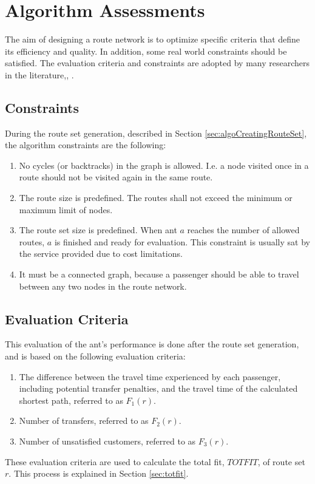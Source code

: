 \section{Algorithm Assessments}
The aim of designing a route network is to optimize specific criteria that define its efficiency and quality. In addition, some real world constraints should be satisfied. The evaluation criteria and constraints are adopted by many researchers in the literature\citep{kechagiopoulos14},\citep{fan09}, \citep{nikolic14}.

\subsection{Constraints}
\label{sec:algoConstraints}
During the route set generation, described in Section \vref{sec:algoCreatingRouteSet}, the algorithm constraints are the following:
\begin{enumerate}
\item \label{itm:constraintCycles} No cycles (or backtracks) in the graph is allowed. I.e. a node visited once in a route should not be visited again in the same route. 
\item \label{itm:constraintRouteSize} The route size is predefined. The routes shall not exceed the minimum or maximum limit of nodes.
\item \label{itm:constraintRouteSetSize} The route set size is predefined. When ant $a$ reaches the number of allowed routes, $a$ is finished and ready for evaluation. This constraint is usually sat by the service provided due to cost limitations.
\item \label{itm:criteriaConnectedGraph} It must be a connected graph, because a passenger should be able to travel between any two nodes in the route network.
\end{enumerate}

\subsection{Evaluation Criteria} 
This evaluation of the ant's performance is done after the route set generation, and is based on the following evaluation criteria:
\begin{enumerate}
\item \label{itm:criteriaTotalTravelTime} The difference between the travel time experienced by each passenger, including potential transfer penalties, and the travel time of the calculated shortest path, referred to as $F_1(r)$.
\item \label{itm:f2} Number of transfers, referred to as $F_2(r)$.
\item Number of unsatisfied customers, referred to as $F_3(r)$. 
\end{enumerate}
These evaluation criteria are used to calculate the total fit, $TOTFIT$, of route set $r$. This process is explained in Section \vref{sec:totfit}.



